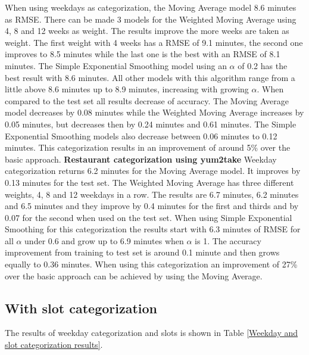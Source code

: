 When using weekdays as categorization, the Moving Average model 8.6 minutes as RMSE. There can be made 3 models for the Weighted Moving Average using 4, 8 and 12 weeks as weight. The results improve the more weeks are taken as weight. The first weight with 4 weeks has a RMSE of 9.1 minutes, the second one improves to 8.5 minutes while the last one is the best with an RMSE of 8.1 minutes. The Simple Exponential Smoothing model using an $\alpha$ of 0.2 has the best result with 8.6 minutes. All other models with this algorithm range from a little above 8.6 minutes up to 8.9 minutes, increasing with growing $\alpha$. When compared to the test set all results decrease of accuracy. The Moving Average model decreases by 0.08 minutes while the Weighted Moving Average increases by 0.05 minutes, but decreases then by 0.24 minutes and 0.61 minutes. The Simple Exponential Smoothing models also decrease between 0.06 minutes to 0.12 minutes.\newline
This categorization results in an improvement of around 5\% over the basic approach.
\newline\newline\textbf{Restaurant categorization using yum2take}\newline
Weekday categorization returns 6.2 minutes for the Moving Average model. It improves by 0.13 minutes for the test set. The Weighted Moving Average has three different weights, 4, 8 and 12 weekdays in a row. The results are 6.7 minutes, 6.2 minutes and 6.5 minutes and they improve by 0.4 minutes for the first and thirds and by 0.07 for the second when used on the test set. When using Simple Exponential Smoothing for this categorization the results start with 6.3 minutes of RMSE for all $\alpha$ under 0.6 and grow up to 6.9 minutes when $\alpha$ is 1. The accuracy improvement from training to test set is around 0.1 minute and then grows equally to 0.36 minutes.\newline
When using this categorization an improvement of 27\% over the basic approach can be achieved by using the Moving Average.
\subsection{With slot categorization}
The results of weekday categorization and slots is shown in Table \ref{Weekday and slot categorization results}.

